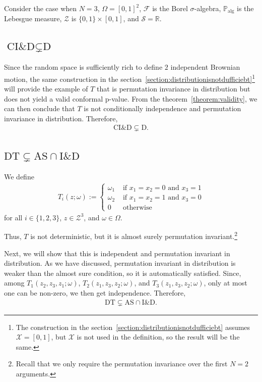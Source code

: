 \documentclass{article}
\begin{document}
Consider the case when $N = 3$, $\Omega = [0,1]^2$, $\mathcal{F}$ is the Borel $\sigma$-algebra, $\mathbb{P}_{\text{alg}}$ is the Lebesgue measure, $\mathcal{Z}$ is $\{0,1\} \times [0,1]$, and $\mathcal{S} = \mathbb{R}$.

\subsection{$\text{CI\&D} \subsetneq \text{D}$}

    Since the random space is sufficiently rich to define $2$ independent Brownian motion, the same construction in the section~\ref{section:distributionisnotdufficiebt}\footnote{The construction in the section~\ref{section:distributionisnotdufficiebt} assumes $\mathcal{X} = [0,1]$, but $\mathcal{X}$ is not used in the definition, so the result will be the same.} will provide the example of $T$ that is permutation invariance in distribution but does not yield a valid conformal p-value. From the theorem~\ref{theorem:validity}, we can then conclude that $T$ is not conditionally independence and permutation invariance in distribution. Therefore,
    \begin{align*}
        \text{CI\&D} \subsetneq \text{D}.
    \end{align*}
    
\subsection{$\text{DT} \subsetneq \text{AS} \cap \text{I\&D}$}

    We define
    \begin{align*}
        T_i(z;\omega) :=  \begin{cases}
            \omega_1 &\text{ if } x_1=x_2=0 \text{ and } x_3=1\\
            \omega_2 &\text{ if } x_1=x_2=1 \text{ and } x_3=0\\
            0 &\text{ otherwise}
        \end{cases}
    \end{align*}
    for all $i\in \{1,2,3\}$, $z \in \mathcal{Z}^3$, and $\omega \in \Omega$.

    Thus, $T$ is not deterministic, but it is almost surely permutation invariant.\footnote{Recall that we only require the permutation invariance over the first $N=2$ arguments.} 
    
    Next, we will show that this is independent and permutation invariant in distribution. As we have discussed, permutation invariant in distribution is weaker than the almost sure condition, so it is automatically satisfied. Since, among $T_1(z_2,z_3,z_1;\omega)$, $T_2(z_1,z_3,z_2;\omega)$, and $T_3(z_1,z_3,z_2;\omega)$, only at most one can be non-zero, we then get independence. Therefore,
    \begin{align*}
        \text{DT} \subsetneq \text{AS} \cap \text{I\&D}.
    \end{align*}
\end{document}
